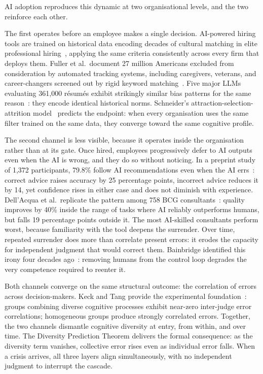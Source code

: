 \documentclass[11pt,a4paper]{article}
\begin{document}
AI adoption reproduces this dynamic at two organisational levels, and
the two reinforce each other.

The first operates before an employee makes a single decision.
AI-powered hiring tools are trained on historical data encoding decades
of cultural matching in elite professional
hiring~\cite{rivera_asr_2012}, applying the same criteria consistently
across every firm that deploys them. Fuller et al.\ document 27 million
Americans excluded from consideration by automated tracking systems,
including caregivers, veterans, and career-changers screened out by
rigid keyword matching~\cite{fuller_hbs_2021}. Five major LLMs
evaluating 361{,}000 r\'{e}sum\'{e}s exhibit strikingly similar bias
patterns for the same
reason~\cite{an_pnasnexus_2025,glazko_facct_2024,wilson_aies_2024}:
they encode identical historical norms. Schneider's
attraction-selection-attrition model~\cite{schneider_pp_1987} predicts
the endpoint: when every organisation uses the same filter trained on
the same data, they converge toward the same cognitive profile.

The second channel is less visible, because it operates inside the
organisation rather than at its gate. Once hired, employees
progressively defer to AI outputs even when the AI is wrong, and they
do so without noticing. In a preprint study of 1{,}372 participants,
79.8\% follow AI recommendations even when the AI
errs~\cite{shaw_psyarxiv_2026}: correct advice raises accuracy by 25
percentage points, incorrect advice reduces it by 14, yet confidence
rises in either case and does not diminish with experience.
Dell'Acqua et al.\ replicate the pattern among 758 BCG
consultants~\cite{dellacqua_orgscience_2026}: quality improves by 40\%
inside the range of tasks where AI reliably outperforms humans, but
falls 19 percentage points outside it. The most AI-skilled consultants
perform worst, because familiarity with the tool deepens the surrender.
Over time, repeated surrender does more than correlate present errors:
it erodes the capacity for independent judgment that would correct them.
Bainbridge identified this irony four decades
ago~\cite{bainbridge_automatica_1983}: removing humans from the control
loop degrades the very competence required to reenter it.

Both channels converge on the same structural outcome: the correlation
of errors across decision-makers. Keck and Tang provide the
experimental foundation~\cite{keck_psychsci_2020}: groups combining
diverse cognitive processes exhibit near-zero inter-judge error
correlations; homogeneous groups produce strongly correlated errors.
Together, the two channels dismantle cognitive diversity at entry, from
within, and over time. The Diversity Prediction Theorem delivers the
formal consequence: as the diversity term vanishes, collective error
rises even as individual error falls. When a crisis arrives, all three
layers align simultaneously, with no independent judgment to interrupt
the cascade.
\end{document}
